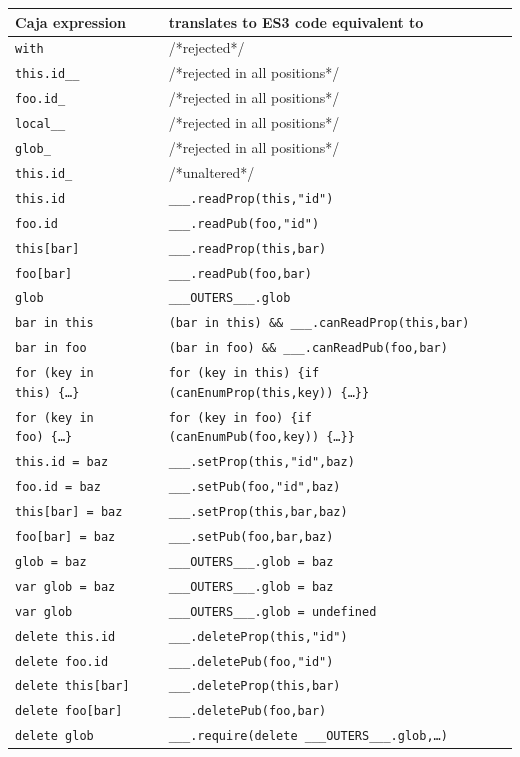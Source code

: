 \documentclass[letterpaper,twocolumn,10pt]{article}
\newcommand{\code}[1]{{\tt {#1}}}              %
\begin{document}
\begin{table}
\begin{tabular}{ll}
  Caja expression    & translates to ES3 code equivalent to\\ 
  \hline
  \code{with}        & /*rejected*/ \\
  \hline
  \code{this.id\_\_} & /*rejected in all positions*/ \\
  \code{foo.id\_}    & /*rejected in all positions*/ \\      
  \code{local\_\_}   & /*rejected in all positions*/ \\        
  \code{glob\_}      & /*rejected in all positions*/ \\        
  \hline
  \code{this.id\_}   & /*unaltered*/ \\
  \code{this.id}     & \code{\_\_\_.readProp(this,"id")}\\
  \code{foo.id}      & \code{\_\_\_.readPub(foo,"id")} \\
  \code{this[bar]}   & \code{\_\_\_.readProp(this,bar)} \\
  \code{foo[bar]}    & \code{\_\_\_.readPub(foo,bar)}  \\
  \code{glob}        & \code{\_\_\_OUTERS\_\_\_.glob} \\
  \hline
  \code{bar in this}           
    & \code{(bar in this) \&\& \_\_\_.canReadProp(this,bar)} \\
  \code{bar in foo}            
    & \code{(bar in foo) \&\& \_\_\_.canReadPub(foo,bar)} \\
  \code{for (key in this)\ \{\ldots\}} 
    &\code{for (key in this)\ \{if (canEnumProp(this,key))\ \{\ldots\}\}}\\
  \code{for (key in foo)\ \{\ldots\}}  
    & \code{for (key in foo)\ \{if (canEnumPub(foo,key))\ \{\ldots\}\}} \\
  \hline
  \code{this.id = baz}    & \code{\_\_\_.setProp(this,"id",baz)} \\
  \code{foo.id = baz}     & \code{\_\_\_.setPub(foo,"id",baz)} \\
  \code{this[bar] = baz}  & \code{\_\_\_.setProp(this,bar,baz)} \\
  \code{foo[bar] = baz}   & \code{\_\_\_.setPub(foo,bar,baz)} \\
  \code{glob = baz}       & \code{\_\_\_OUTERS\_\_\_.glob = baz} \\
  \code{var glob = baz}   & \code{\_\_\_OUTERS\_\_\_.glob = baz} \\
  \code{var glob}         & \code{\_\_\_OUTERS\_\_\_.glob = undefined} \\
  \hline               
  \code{delete this.id}   & \code{\_\_\_.deleteProp(this,"id")} \\
  \code{delete foo.id}    & \code{\_\_\_.deletePub(foo,"id")} \\
  \code{delete this[bar]} & \code{\_\_\_.deleteProp(this,bar)} \\
  \code{delete foo[bar]}  & \code{\_\_\_.deletePub(foo,bar)} \\
  \code{delete glob}      
         & \code{\_\_\_.require(delete \_\_\_OUTERS\_\_\_.glob,\ldots)} \\
\end{tabular}


\end{table}
\end{document}
